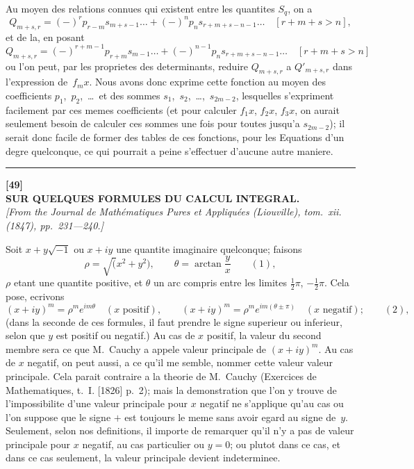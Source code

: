 \documentclass[11pt,a4paper]{article}
\begin{document}
\newpage
Au moyen des relations connues qui existent entre les quantites $S_q$, on a
\[
Q_{m+s,r} = (-)^r p_{r-m} s_{m+s-1} \ldots + (-)^n p_n s_{r+m+s-n-1} \ldots \quad [r+m+s > n],
\]
et de la, en posant
\[
Q_{m+s,r} = (-)^{r+m-1} p_{r+m} s_{m-1} \ldots + (-)^{n-1} p_n s_{r+m+s-n-1} \ldots \quad [r+m+s > n]
\]
ou l'on peut, par les proprietes des determinants, reduire $Q_{m+s,r}$ a $Q'_{m+s,r}$ dans l'expression de~$f_m x$. Nous avons donc exprime cette fonction au moyen des coefficients $p_1$,~$p_2$,~\ldots\ et des sommes $s_1$,~$s_2$,~\ldots,~$s_{2m-2}$, lesquelles s'expriment facilement par ces memes coefficients (et pour calculer $f_1x$, $f_2x$, $f_3x$, on aurait seulement besoin de calculer ces sommes une fois pour toutes jusqu'a $s_{2m-2}$); il serait donc facile de former des tables de ces fonctions, pour les Equations d'un degre quelconque, ce qui pourrait a peine s'effectuer d'aucune autre maniere.

\vspace{20pt}
\begin{center}
\rule{0.5\textwidth}{0.4pt}
\end{center}


\newpage
\begin{center}
\textbf{[49]}\\[4pt]
\textbf{\large SUR QUELQUES FORMULES DU CALCUL INTEGRAL.}\\[4pt]
\textit{[From the Journal de Math\'ematiques Pures et Appliqu\'ees (Liouville), tom.~xii. (1847), pp.~231---240.]}
\end{center}

\vspace{6pt}

Soit $x + y\surd{-1}$ ou $x+iy$ une quantite imaginaire quelconque; faisons
\[
\rho = \surd(x^2+y^2), \qquad \theta = \arctan\frac{y}{x} \qquad(1),
\]
$\rho$ etant une quantite positive, et $\theta$ un arc compris entre les limites $\frac{1}{2}\pi$, $-\frac{1}{2}\pi$. Cela pose, ecrivons
\[
(x+iy)^m = \rho^m e^{im\theta} \quad (x \text{ positif}), \qquad (x+iy)^m = \rho^m e^{im(\theta\pm\pi)} \quad (x \text{ negatif}); \qquad(2),
\]
(dans la seconde de ces formules, il faut prendre le signe superieur ou inferieur, selon que $y$ est positif ou negatif.) Au cas de $x$ positif, la valeur du second membre sera ce que M.~Cauchy a appele valeur principale de $(x+iy)^m$. Au cas de $x$ negatif, on peut aussi, a ce qu'il me semble, nommer cette valeur valeur principale. Cela parait contraire a la theorie de M.~Cauchy (Exercices de Mathematiques, t.~I. [1826] p.~2); mais la demonstration que l'on y trouve de l'impossibilite d'une valeur principale pour $x$ negatif ne s'applique qu'au cas ou l'on suppose que le signe $+$ est toujours le meme sans avoir egard au signe de~$y$. Seulement, selon nos definitions, il importe de remarquer qu'il n'y a pas de valeur principale pour $x$ negatif, au cas particulier ou $y=0$; ou plutot dans ce cas, et dans ce cas seulement, la valeur principale devient indeterminee.
\end{document}
